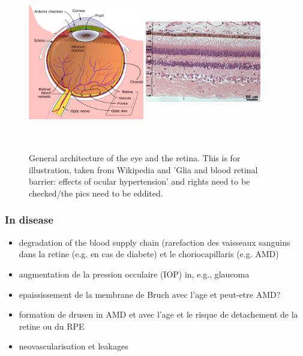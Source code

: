 \documentclass[12pt,a4paper]{journal}
\begin{document}
\begin{figure}[h]
  \centering
  \includegraphics[width=0.45\textwidth, height=7cm]{ArchitectureEye} %
  \hfill
  \includegraphics[width=0.45\textwidth, height=7cm]{RetinaHistology}
  \caption{General architecture of the eye and the retina. This is for illustration, taken from Wikipedia and 'Glia and blood retinal barrier: effects of ocular hypertension' and rights need to be checked/the pics need to be eddited.}
  \label{fig:architecture-eye}
\end{figure}
\subsubsection{In disease}

\begin{itemize}
\item degradation of the blood supply chain (rarefaction des vaisseaux sanguins dans la retine (e.g. en cas de diabete) et le choriocapillaris (e.g. AMD)
\item augmentation de la pression occulaire (IOP) in, e.g., glaucoma
\item epaississement de la membrane de Bruch avec l'age et peut-etre AMD?
\item formation de drusen in AMD et avec l'age et le risque de detachement de la retine ou du RPE
\item neovascularisation et leakages
\end{itemize}

{\normalsize }
\end{document}
